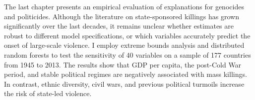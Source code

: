The last chapter presents an empirical evaluation of explanations for genocides and politicides. Although the literature on state-sponsored killings has grown significantly over the last decades, it remains unclear whether estimates are robust to different model specifications, or which variables accurately predict the onset of large-scale violence. I employ extreme bounds analysis and distributed random forests to test the sensitivity of 40 variables on a sample of 177 countries from 1945 to 2013. The results show that GDP per capita, the post-Cold War period, and stable political regimes are negatively associated with mass killings. In contrast, ethnic diversity, civil wars, and previous political turmoils increase the risk of state-led violence. 